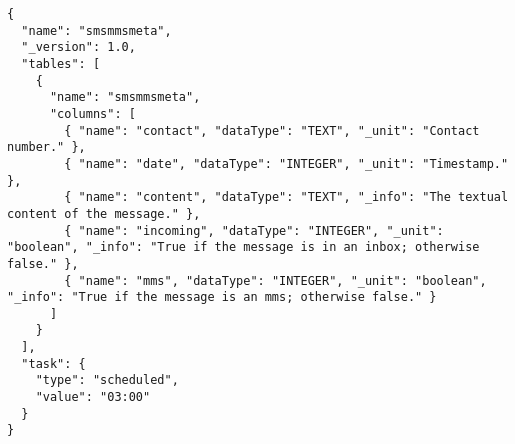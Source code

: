 \begin{lstlisting}[float,
basicstyle=\ttfamily\footnotesize,
caption={Modul definitionen for sms/mms},label=module:sms]
{
  "name": "smsmmsmeta",
  "_version": 1.0,
  "tables": [
    {
      "name": "smsmmsmeta",
      "columns": [
        { "name": "contact", "dataType": "TEXT", "_unit": "Contact number." },
        { "name": "date", "dataType": "INTEGER", "_unit": "Timestamp." },
        { "name": "content", "dataType": "TEXT", "_info": "The textual content of the message." },
        { "name": "incoming", "dataType": "INTEGER", "_unit": "boolean", "_info": "True if the message is in an inbox; otherwise false." },
        { "name": "mms", "dataType": "INTEGER", "_unit": "boolean", "_info": "True if the message is an mms; otherwise false." }
      ]
    }
  ],
  "task": {
    "type": "scheduled",
    "value": "03:00"
  }
}
\end{lstlisting}